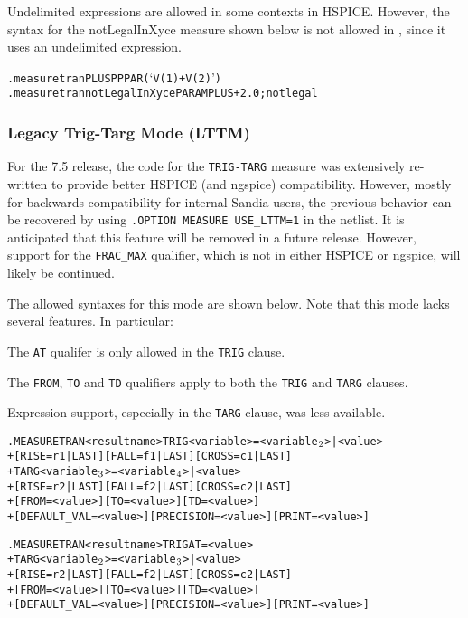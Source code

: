 Undelimited expressions are allowed in some contexts in HSPICE.
However, the syntax for the notLegalInXyce measure shown below
is not allowed in \Xyce{}, since it uses an undelimited expression.
\begin{alltt}
.measure tran PLUS PP PAR(`V(1)+V(2)')
.measure tran notLegalInXyce PARAM PLUS+2.0 ; not legal
\end{alltt}

\subsubsection{Legacy Trig-Targ Mode (LTTM)}
For the \Xyce{} 7.5 release, the code for the \texttt{TRIG-TARG} measure
was extensively re-written to provide better HSPICE (and ngspice)
compatibility.  However, mostly for backwards compatibility for
internal Sandia users, the previous behavior can be recovered by
using \texttt{.OPTION MEASURE USE\_LTTM=1} in the netlist.  It is
anticipated that this feature will be removed in a future release.
However, support for the \texttt{FRAC\_MAX} qualifier, which is not
in either HSPICE or ngspice, will likely be continued.

The allowed syntaxes for this mode are shown below.  Note that this
mode lacks several features.  In particular:

\begin{XyceItemize}
  \item The \texttt{AT} qualifer is only allowed in the \texttt{TRIG} clause.
  \item The \texttt{FROM}, \texttt{TO} and \texttt{TD} qualifiers apply to
both the \texttt{TRIG} and \texttt{TARG} clauses.
  \item Expression support, especially in the \texttt{TARG} clause, was less
available.
\end{XyceItemize}

\begin{Command}
\format
\begin{alltt}
.MEASURE TRAN <result name> TRIG <variable>=<variable\(\sb{2}\)>|<value>
+ [RISE=r1|LAST] [FALL=f1|LAST] [CROSS=c1|LAST]
+ TARG <variable\(\sb{3}\)>=<variable\(\sb{4}\)>|<value> 
+ [RISE=r2|LAST] [FALL=f2|LAST] [CROSS=c2|LAST]
+ [FROM=<value>] [TO=<value>] [TD=<value>] 
+ [DEFAULT_VAL=<value>] [PRECISION=<value>] [PRINT=<value>]

.MEASURE TRAN <result name> TRIG AT=<value>
+ TARG <variable\(\sb{2}\)>=<variable\(\sb{3}\)>|<value> 
+ [RISE=r2|LAST] [FALL=f2|LAST] [CROSS=c2|LAST]
+ [FROM=<value>] [TO=<value>] [TD=<value>] 
+ [DEFAULT_VAL=<value>] [PRECISION=<value>] [PRINT=<value>]
\end{alltt}
\end{Command}


